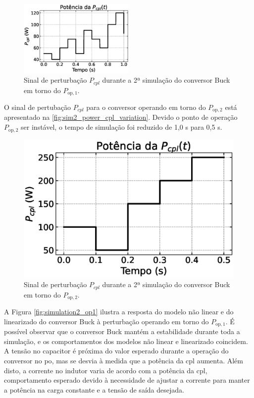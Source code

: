 \begin{figure}[H]
  \centering
  \includegraphics[width=0.5\textwidth]{figuras/buck/power_cpl_variation.eps}
  \captionsetup{justification=centering}
  \caption{Sinal de perturbação $P_{cpl}$ durante a 2ª simulação do conversor Buck em torno do $P_{\mathrm{op}, 1}$.}
  \label{fig:power_cpl_variation}
\end{figure}

O sinal de pertubação $P_{cpl}$ para o conversor operando em torno do $P_{\mathrm{op}, 2}$ está apresentado na \autoref{fig:sim2_power_cpl_variation}. Devido o ponto de operação $P_{\mathrm{op}, 2}$ ser instável, o tempo de simulação foi reduzido de 1,0 s para 0,5 s.

\begin{figure}[H]
  \centering
  \includegraphics[width=.5 \textwidth]{figuras/buck/sim2_power_cpl_variation.eps}
  \captionsetup{justification=centering}
  \caption{Sinal de perturbação $P_{cpl}$ durante a 2ª simulação do conversor Buck em torno do $P_{\mathrm{op}, 2}$.}
  \label{fig:sim2_power_cpl_variation}
\end{figure}

A Figura \ref{fig:simulation2_op1} ilustra a resposta do modelo não linear e do linearizado do conversor Buck à perturbação operando em torno do $P_{\mathrm{op}, 1}$.  É possível observar que o conversor Buck mantém a estabilidade durante toda a simulação, e os comportamentos dos modelos não linear e linearizado coincidem. A tensão no capacitor é próxima do valor esperado durante a operação do conversor no \acrshort{po}, mas se desvia à medida que a potência da \acrshort{cpl} aumenta. Além disto, a corrente no indutor varia de acordo com a potência da \acrshort{cpl}, comportamento esperado devido à necessidade de ajustar a corrente para manter a potência na carga constante e a tensão de saída desejada.

